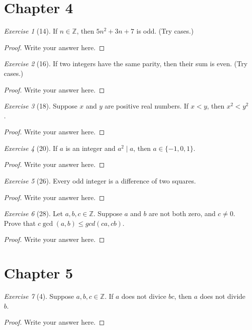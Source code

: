 \documentclass[12pt]{amsart}
\theoremstyle{remark}
\newtheorem*{exercise}{Exercise}%
\def\ZZ{\ensuremath{\mathbb Z}}
\theoremstyle{mycomment}
\begin{document}
\thispagestyle{fancy}
\section*{Chapter 4}
\begin{exercise}[14] If $n\in\ZZ$, then $5n^{2}+3n+7$ is odd. (Try cases.)
\begin{proof}
Write your answer here.
\end{proof}
\end{exercise}

\begin{exercise}[16] If two integers have the same parity, then their sum is even. (Try cases.)
\begin{proof}
Write your answer here.
\end{proof}
\end{exercise}

\begin{exercise}[18] Suppose $x$ and $y$ are positive real numbers. If $x<y$, then $x^{2}<y^{2}$.
\begin{proof}
Write your answer here.
\end{proof}
\end{exercise}

\begin{exercise}[20] If $a$ is an integer and $a^{2}\mid a$, then $a\in\{-1,0,1\}$.
\begin{proof}
Write your answer here.
\end{proof}
\end{exercise}

\begin{exercise}[26] Every odd integer is a difference of two squares. 
\begin{proof}
Write your answer here.
\end{proof}
\end{exercise}

\begin{exercise}[28] Let $a,b,c\in\ZZ$. Suppose $a$ and $b$ are not both  zero, and $c\ne 0$. Prove that $c\gcd(a,b)\le gcd(ca,cb)$.
\begin{proof}
Write your answer here.
\end{proof}
\end{exercise}
\section*{Chapter 5}
\begin{exercise}[4] Suppose $a,b,c \in\ZZ$. If $a$ does not divice $bc$, then $a$ does not divide $b$.
\begin{proof}
Write your answer here.
\end{proof}
\end{exercise}
\end{document}
